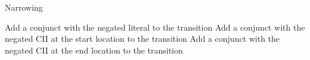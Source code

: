 \begin{algorithm}
\caption{Narrowing}\label{narrowing}
\begin{algorithmic}[1]
        \State Add a conjunct with the negated literal to the transition
      \EndIf
    \EndFor
  \EndFor
    \State Add a conjunct with the negated CII at the start location to the transition
    \State Add a conjunct with the negated CII at the end location to the transition
  \EndFor
\end{algorithmic}
\end{algorithm}
